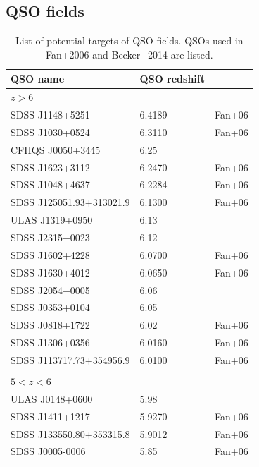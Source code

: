 \documentclass[useAMS,usenatbib,twocolumn]{mn2e}
\begin{document}
\subsection{QSO fields}
\begin{table}
\centering
\caption{List of potential targets of QSO fields. QSOs used in Fan+2006 and 
Becker+2014 are listed.} \label{table:qso_field}
\begin{tabular}{lll}
\hline
QSO name                               & QSO redshift  &         \\ 

\hline
$z>6$            &      \\
SDSS J1148+5251                   &  6.4189       & Fan+06  \\
SDSS J1030+0524                   &  6.3110       & Fan+06  \\
CFHQS J0050+3445                  & 6.25 \\
SDSS J1623+3112                   &  6.2470       & Fan+06  \\
SDSS J1048+4637                   &  6.2284       & Fan+06  \\
SDSS J125051.93+313021.9          &  6.1300       & Fan+06  \\
ULAS J1319+0950                   & 6.13 \\
SDSS J2315−0023                   & 6.12 \\
SDSS J1602+4228                   &  6.0700       & Fan+06  \\
SDSS J1630+4012                   &  6.0650       & Fan+06  \\
SDSS J2054−0005                   & 6.06 \\
SDSS J0353+0104                   & 6.05 \\
SDSS J0818+1722                   & 6.02         & Fan+06  \\
SDSS J1306+0356                   &  6.0160       & Fan+06  \\
SDSS J113717.73+354956.9          &  6.0100       & Fan+06  \\
\\
$5<z<6$ \\
ULAS J0148+0600                   & 5.98 \\
SDSS J1411+1217                   &  5.9270       & Fan+06  \\
SDSS J133550.80+353315.8          &  5.9012       & Fan+06  \\
SDSS J0005-0006                   &  5.85         & Fan+06  \\    

\end{tabular}
\end{table}
\end{document}
